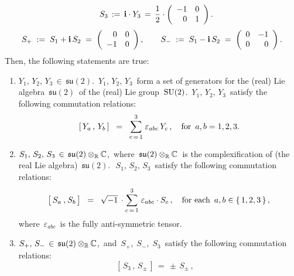 \begin{proposition}
\begin{equation*}
\quad
S_{3} \,:=\, \textnormal{\bf i} \cdot Y_{3} \,=\, \dfrac{1}{2}\cdot\left(\begin{array}{rr} -1 & 0 \\ 0 & 1 \end{array}\right).
\end{equation*}
\begin{equation*}
S_{+} \; := \; S_{1} + \textnormal{\bf i}\,S_{2} \; = \; \left(\begin{array}{rr} 0 & 0 \\ -1 & 0 \end{array}\right),
\quad\quad
S_{-} \; := \; S_{1} - \textnormal{\bf i}\,S_{2} \; = \; \left(\begin{array}{rr} 0 & -1 \\ 0 & 0 \end{array}\right).
\end{equation*}
Then, the following statements are true:
\begin{enumerate}
\item
	$Y_{1},\, Y_{2},\, Y_{3} \,\in\, \mathfrak{su}(2)$.\,
	$Y_{1},\, Y_{2},\, Y_{3}$\,
	form a set of generators for the (real) Lie algebra \,$\mathfrak{su}(2)$\, of the (real) Lie group \,$\textnormal{SU}(2)$.\,
	$Y_{1},\, Y_{2},\, Y_{3}$\, satisfy the following commutation relations:
	\begin{equation*}
	\left[\,Y_{a}\,,\,Y_{b}\,\right] \;\; = \;\; \overset{3}{\underset{c\,=\,1}{\sum}}\;\varepsilon_{abc}\,Y_{c}\,,
	\quad
	\textnormal{for \,$a, b = 1,2,3$}.
	\end{equation*}
\item
	$S_{1},\, S_{2},\, S_{3} \,\in\, \mathfrak{su}(2) \otimes_{\mathbb{R}} \mathbb{C}$,\,
	where
	\,$\mathfrak{su}(2) \otimes_{\mathbb{R}} \mathbb{C}$\,
	is the complexification of (the real Lie algebra)
	\,$\mathfrak{su}(2)$.\,
	\,$S_{1},\, S_{2},\, S_{3}$\,
	satisfy the following commutation relations:
	\begin{equation*}
	\left[\,S_{a}\,\overset{{\color{white}1}}{,}\,S_{b}\,\right]
	\;\; = \;\;
		\sqrt{-1}\,\cdot\overset{3}{\underset{c\,=\,1}{\sum}}\;\varepsilon_{abc}\cdot S_{c}\,,
	\quad
	\textnormal{for each \,$a, b \in \{\,1,2,3\,\}$}\,,
	\end{equation*}
	where \,$\varepsilon_{abc}$\, is the fully anti-symmetric tensor.
\item
	$S_{+},\, S_{-} \,\in\, \mathfrak{su}(2) \otimes_{\mathbb{R}} \mathbb{C}$,\,
	and
	\,$S_{+},\; S_{-},\; S_{3}$\, satisfy the following commutation relations:
	\begin{equation*}
	\left[\,S_{3}\,,\,S_{\pm}\,\right] \, = \, \pm\,S_{\pm}\,,
	\quad

\end{equation*}
\end{enumerate}
\end{proposition}
